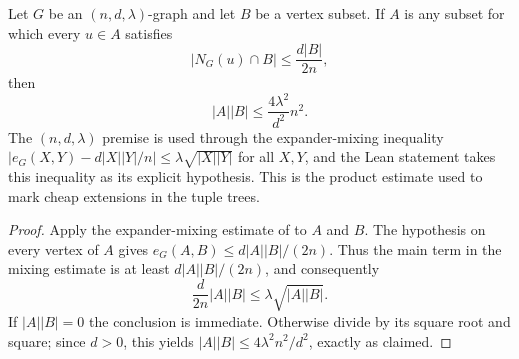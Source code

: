 \begin{lemma}
Let $G$ be an $(n,d,\lambda)$-graph and let $B$ be a vertex subset.  If
$A$ is any subset for which every $u\in A$ satisfies
\[
 |N_G(u)\cap B|\leq \frac{d|B|}{2n},
\]
then
\[
 |A||B|\leq \frac{4\lambda^2}{d^2}n^2.
\]
The $(n,d,\lambda)$ premise is used through the expander-mixing inequality
$|e_G(X,Y)-d|X||Y|/n|\leq\lambda\sqrt{|X||Y|}$ for all $X,Y$, and the
Lean statement takes this inequality as its explicit hypothesis.
This is the product estimate used to mark cheap extensions in the tuple
trees.
\end{lemma}
\begin{proof}
Apply the expander-mixing estimate of  to $A$ and
$B$.  The hypothesis on every vertex of $A$ gives
$e_G(A,B)\leq d|A||B|/(2n)$.  Thus the main term in the mixing estimate is
at least $d|A||B|/(2n)$, and consequently
\[
 \frac d{2n}|A||B|\leq \lambda\sqrt{|A||B|}.
\]
If $|A||B|=0$ the conclusion is immediate.  Otherwise divide by its square
root and square; since $d>0$, this yields
$|A||B|\leq4\lambda^2n^2/d^2$, exactly as claimed.
\end{proof}

